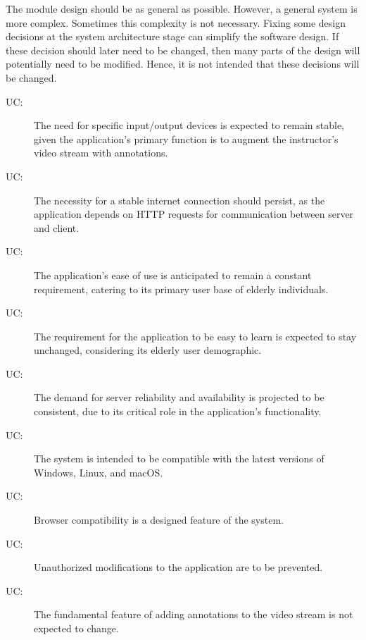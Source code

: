 \documentclass[12pt, titlepage]{article}
\newcounter{ucnum}
\newcommand{\uctheucnum}{UC\theucnum}
\begin{document}
The module design should be as general as possible. However, a general system is
more complex. Sometimes this complexity is not necessary. Fixing some design
decisions at the system architecture stage can simplify the software design. If
these decision should later need to be changed, then many parts of the design
will potentially need to be modified. Hence, it is not intended that these
decisions will be changed.

\begin{description}
\item[ \uctheucnum:] The need for specific input/output devices is expected to remain stable, given the application's primary function is to augment the instructor’s video stream with annotations.

\item[ \uctheucnum:]  The necessity for a stable internet connection should persist, as the application depends on HTTP requests for communication between server and client.

\item[ \uctheucnum:]  The application's ease of use is anticipated to remain a constant requirement, catering to its primary user base of elderly individuals.

\item[ \uctheucnum:] The requirement for the application to be easy to learn is expected to stay unchanged, considering its elderly user demographic.

\item[ \uctheucnum:] The demand for server reliability and availability is projected to be consistent, due to its critical role in the application's functionality.

\item[ \uctheucnum:] The system is intended to be compatible with the latest versions of Windows, Linux, and macOS.

\item[ \uctheucnum:] Browser compatibility is a designed feature of the system.

\item[ \uctheucnum:] Unauthorized modifications to the application are to be prevented.

\item[ \uctheucnum:] The fundamental feature of adding annotations to the video stream is not expected to change.


\end{description}
\end{document}
